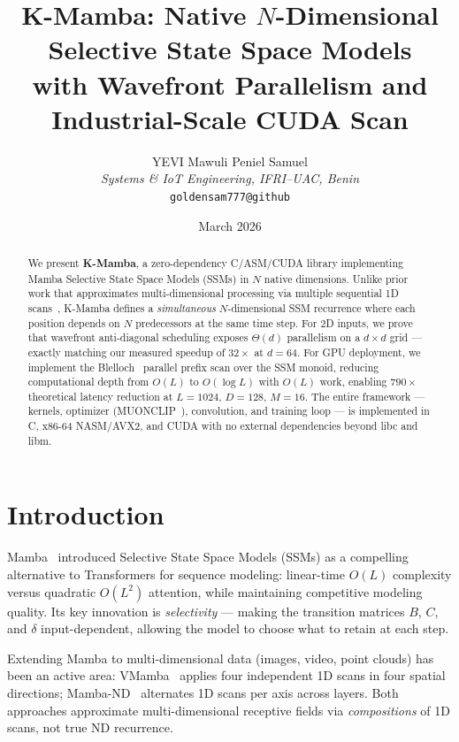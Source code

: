 \documentclass[10pt,twocolumn]{article}
\title{\textbf{K-Mamba: Native $N$-Dimensional Selective State Space Models\\
with Wavefront Parallelism and Industrial-Scale CUDA Scan}}
\author{
  YEVI Mawuli Peniel Samuel\\
  \textit{Systems \& IoT Engineering, IFRI--UAC, Benin}\\
  \texttt{goldensam777@github}
}
\date{March 2026}
\begin{document}
\maketitle

\begin{abstract}
We present \textbf{K-Mamba}, a zero-dependency C/ASM/CUDA library implementing
Mamba Selective State Space Models (SSMs) in $N$ native dimensions.
Unlike prior work that approximates multi-dimensional processing via multiple
sequential 1D scans~\cite{vmamba,mamband},
K-Mamba defines a \emph{simultaneous} $N$-dimensional SSM recurrence where
each position depends on $N$ predecessors at the same time step.
For 2D inputs, we prove that wavefront anti-diagonal scheduling exposes
$\Theta(d)$ parallelism on a $d \times d$ grid — exactly matching our
measured speedup of $32\times$ at $d = 64$.
For GPU deployment, we implement the Blelloch~\cite{blelloch1990}
parallel prefix scan over the SSM monoid, reducing computational
depth from $O(L)$ to $O(\log L)$ with $O(L)$ work, enabling
$790\times$ theoretical latency reduction at $L = 1024$, $D = 128$, $M = 16$.
The entire framework — kernels, optimizer (MUONCLIP~\cite{muon2025}),
convolution, and training loop — is implemented in
C, x86-64 NASM/AVX2, and CUDA with no external dependencies beyond libc and libm.
\end{abstract}

\section{Introduction}

Mamba~\cite{mamba2023} introduced Selective State Space Models (SSMs) as a
compelling alternative to Transformers for sequence modeling: linear-time
$O(L)$ complexity versus quadratic $O(L^2)$ attention, while maintaining
competitive modeling quality.
Its key innovation is \emph{selectivity} — making the transition matrices
$B$, $C$, and $\delta$ input-dependent, allowing the model to choose what
to retain at each step.

Extending Mamba to multi-dimensional data (images, video, point clouds)
has been an active area:
VMamba~\cite{vmamba} applies four independent 1D scans in four spatial directions;
Mamba-ND~\cite{mamband} alternates 1D scans per axis across layers.
Both approaches approximate multi-dimensional receptive fields via
\emph{compositions} of 1D scans, not true ND recurrence.
\end{document}
